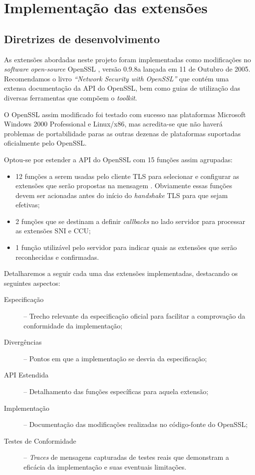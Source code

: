 
\chapter{Implementação das extensões}

\section{Diretrizes de desenvolvimento}

As extensões abordadas neste projeto foram implementadas como modificações 
no \emph{software} \emph{open-source} OpenSSL \cite{openssl}, versão 0.9.8a lançada em 11 de Outubro de 2005.
Recomendamos o livro \emph{``Network Security with OpenSSL''} \cite{opensslbook} que contém uma
extensa documentação da \acs{API} do OpenSSL, bem como guias de utilização das diversas
ferramentas que compõem o \emph{toolkit}.

O OpenSSL assim modificado foi testado com sucesso nas plataformas 
Microsoft Windows 2000 Professional e Linux/x86, mas acredita-se que não haverá 
problemas de portabilidade paras as outras dezenas de plataformas suportadas 
oficialmente pelo OpenSSL.

Optou-se por estender a \acs{API} do OpenSSL com 15 funções assim agrupadas:
\begin{itemize}
\item 12 funções a serem usadas pelo cliente TLS para selecionar e configurar as 
extensões que serão propostas na mensagem \tlsHsCh. Obviamente 
essas funções devem ser acionadas antes do início do \emph{handshake} TLS para 
que sejam efetivas;
\item 2 funções que se destinam a definir \emph{callbacks} no lado servidor para 
processar as extensões \acl{SNI} e \acl{CCU};
\item 1 função utilizável pelo servidor para indicar quais as extensões que 
serão reconhecidas e confirmadas.
\end{itemize}

Detalharemos a seguir cada uma das extensões implementadas, destacando os 
seguintes aspectos:

\begin{description}
\item[Especificação] -- Trecho relevante da especificação oficial para facilitar a 
comprovação da conformidade da implementação;
\item[Divergências] -- Pontos em que a implementação se desvia da
especificação;
\item[API Estendida] -- Detalhamento das funções específicas para aquela 
extensão;
\item[Implementação] -- Documentação das modificações realizadas no 
código-fonte do OpenSSL;
\item[Testes de Conformidade] -- \emph{Traces} de mensagens capturadas de testes 
reais que demonstram a eficácia da implementação e suas eventuais 
limitações.
\end{description}

